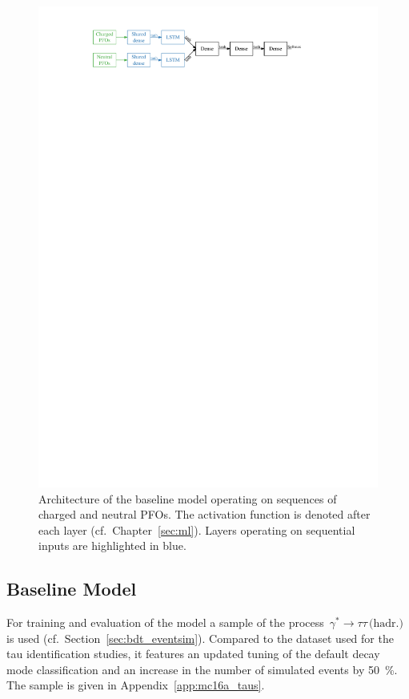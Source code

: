 \begin{figure}[htb]
  \centering
  \includegraphics{./figures/decay_mode_classification/baseline_architecture.pdf}
  \caption{Architecture of the baseline model operating on sequences of charged
    and neutral PFOs. The activation function is denoted after each layer (cf.\
    Chapter~\ref{sec:ml}). Layers operating on sequential inputs are highlighted
    in blue.}
  \label{fig:pfo_rnn_baseline_arch}
\end{figure}

\subsection{Baseline Model}
\label{sec:pfo_baseline}

For training and evaluation of the model a sample of the
process~$\gamma^* \rightarrow \tau \tau \, \text{(hadr.)}$ is used (cf.\
Section~\ref{sec:bdt_eventsim}). Compared to the dataset used for the
tau identification studies, it features an updated tuning of the default decay
mode classification and an increase in the number of simulated events by
\SI{50}{\percent}. The sample is given in Appendix~\ref{app:mc16a_taus}.

